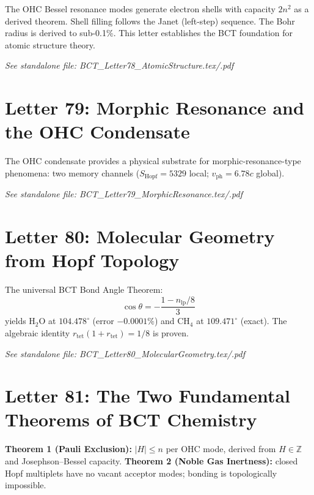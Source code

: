 \documentclass[aps,preprint,superscriptaddress,floatfix]{revtex4-2}
\begin{document}
The OHC Bessel resonance modes generate electron shells with
capacity $2n^2$ as a derived theorem. Shell filling follows
the Janet (left-step) sequence. The Bohr radius is derived
to sub-0.1\%. This letter establishes the BCT foundation
for atomic structure theory.

\textit{See standalone file: BCT\_Letter78\_AtomicStructure.tex/.pdf}

\newpage
\section*{Letter 79: Morphic Resonance and the OHC Condensate}

The OHC condensate provides a physical substrate for
morphic-resonance-type phenomena: two memory channels
($S_\mathrm{Hopf} = 5329$ local; $v_\mathrm{ph} = 6.78c$ global).

\textit{See standalone file: BCT\_Letter79\_MorphicResonance.tex/.pdf}

\newpage
\section*{Letter 80: Molecular Geometry from Hopf Topology}

The universal BCT Bond Angle Theorem:
\begin{equation}
  \cos\theta = -\frac{1 - n_\mathrm{lp}/8}{3}
\end{equation}
yields H$_2$O at $104.478^\circ$ (error $-0.0001\%$) and
CH$_4$ at $109.471^\circ$ (exact). The algebraic identity
$r_\mathrm{tet}(1+r_\mathrm{tet}) = 1/8$ is proven.

\textit{See standalone file: BCT\_Letter80\_MolecularGeometry.tex/.pdf}

\newpage
\section*{Letter 81: The Two Fundamental Theorems of BCT Chemistry}

\textbf{Theorem 1 (Pauli Exclusion):} $|H| \leq n$ per OHC mode,
derived from $H \in \mathbb{Z}$ and Josephson--Bessel capacity.
\textbf{Theorem 2 (Noble Gas Inertness):} closed Hopf multiplets
have no vacant acceptor modes; bonding is topologically impossible.
\end{document}
